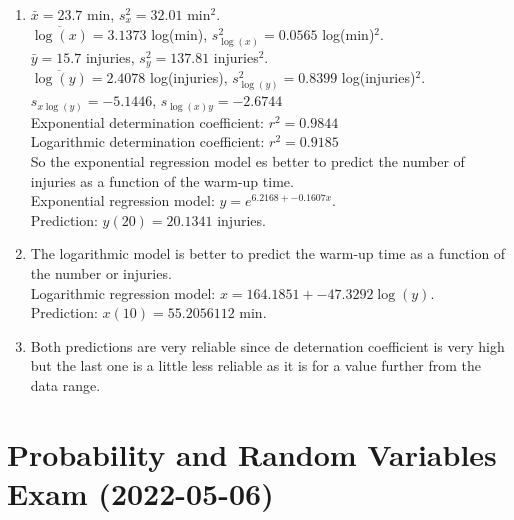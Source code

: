 \documentclass[
  a4paper,
]{scrreport}
\theoremstyle{definition}
\theoremstyle{remark}
\begin{document}
\begin{tcolorbox}
\begin{enumerate}
\def\labelenumi{\alph{enumi}.}
\item
  \(\bar x=23.7\) min, \(s_x^2=32.01\) min\(^2\).\\
  \(\overline{\log(x)}=3.1373\) log(min), \(s_{\log(x)}^2=0.0565\)
  log(min)\(^2\).\\
  \(\bar y=15.7\) injuries, \(s_y^2=137.81\) injuries\(^2\).\\
  \(\overline{\log(y)}=2.4078\) log(injuries), \(s_{\log(y)}^2=0.8399\)
  log(injuries)\(^2\).\\
  \(s_{x\log(y)}=-5.1446\), \(s_{\log(x)y}=-2.6744\)\\
  Exponential determination coefficient: \(r^2=0.9844\)\\
  Logarithmic determination coefficient: \(r^2=0.9185\)\\
  So the exponential regression model es better to predict the number of
  injuries as a function of the warm-up time.\\
  Exponential regression model: \(y=e^{6.2168+-0.1607x}\).\\
  Prediction: \(y(20)=20.1341\) injuries.
\item
  The logarithmic model is better to predict the warm-up time as a
  function of the number or injuries.\\
  Logarithmic regression model: \(x=164.1851+-47.3292\log(y)\).\\
  Prediction: \(x(10)=55.2056112\) min.
\item
  Both predictions are very reliable since de deternation coefficient is
  very high but the last one is a little less reliable as it is for a
  value further from the data range.
\end{enumerate}

\end{tcolorbox}


\hypertarget{probability-and-random-variables-exam-2022-05-06}{%
\chapter{Probability and Random Variables Exam
(2022-05-06)}\label{probability-and-random-variables-exam-2022-05-06}}
\end{document}
